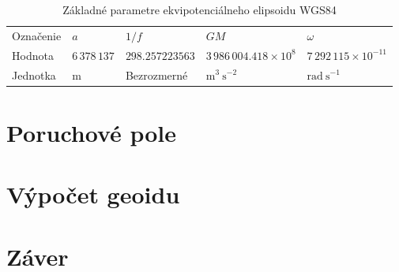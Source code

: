 \documentclass[a4paper, 12pt]{book}
\begin{document}
\begin{table}
\begin{center}
\caption{Základné parametre ekvipotenciálneho elipsoidu WGS84 \citep{WGS84}}
\label{tab:2}
\begin{tabular}{l l l l l}
\hline
Označenie & $a$ & $1 \slash f$ & $GM$ & $\omega$\\
Hodnota   & $6\,378\,137$ & $298.257223563$ & $3\,986\,004.418 \times 10^8$ 
& $7\,292\,115 \times 10^{-11}$\\
Jednotka  & $\mathrm{m}$ & Bezrozmerné & $\mathrm{m}^3 \ \mathrm{s}^{-2}$ 
& $\mathrm{rad} \ \mathrm{s}^{-1}$\\
\hline
\end{tabular}
\end{center}
\end{table}









\chapter{Poruchové pole}
\label{sec:disturbing_field}








\chapter{Výpočet geoidu}
\label{sec:geoid_determination}







\chapter*{Záver}
\end{document}
